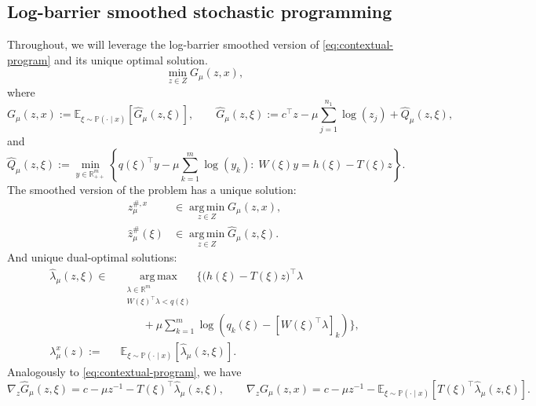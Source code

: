 \documentclass{article}
\newcommand{\R}{\mathbb{R}}
\newcommand{\E}{\mathbb{E}}
\newcommand{\argmin}{\operatorname*{arg\,min}}
\newcommand{\argmax}{\operatorname*{arg\,max}}
\theoremstyle{plain}
\begin{document}
\subsection{Log-barrier smoothed stochastic programming}
\label{sec:contextual-logbarrier}
Throughout, we will leverage the log-barrier smoothed version of \eqref{eq:contextual-program} and its unique
optimal solution.
\begin{equation}
\label{eq:contextual-program-mu}
\min_{z\in Z} G_\mu(z,x),
\end{equation}
where
\begin{equation}
\label{eq:contextual-G-mu}
G_\mu(z,x):=\E_{\xi\sim\mathbb P(\cdot\mid x)}\!\left[\hat G_\mu(z,\xi)\right],
\qquad
\hat G_\mu(z,\xi):=c^\top z-\mu\sum_{j=1}^{n_1}\log(z_j)+\hat Q_\mu(z,\xi),
\end{equation}
and
\begin{equation}
\label{eq:contextual-hatQ-mu}
\hat Q_\mu(z,\xi):=
\min_{y\in\R^{m}_{++}}
\left\{
q(\xi)^\top y-\mu\sum_{k=1}^{m}\log(y_k):\;W(\xi)y=h(\xi)-T(\xi)z
\right\}.
\end{equation}
The smoothed version of the problem has a unique solution:
\begin{equation}
\label{eq:canonical-contextual-solution-mu}
\begin{aligned}
z_\mu^{\#,x} &\in \argmin_{z\in Z} G_\mu(z,x),\\
\hat z_\mu^{\#}(\xi) &\in \argmin_{z\in Z} \hat G_\mu(z,\xi).
\end{aligned}
\end{equation}
And unique dual-optimal solutions:
\begin{equation}
\label{eq:contextual-dual-mu}
\begin{aligned}
\hat\lambda_\mu(z,\xi)\in\;&
\argmax_{\substack{\lambda\in\R^{m}\\ W(\xi)^\top\lambda<q(\xi)}}
\Bigg\{
\big(h(\xi)-T(\xi)z\big)^\top\lambda \\
&\qquad
+ \mu\sum_{k=1}^{m}\log\!\left(q_k(\xi)-[W(\xi)^\top\lambda]_k\right)
\Bigg\},\\
\lambda_\mu^x(z):=\;&\E_{\xi\sim\mathbb P(\cdot\mid x)}\!\left[\hat\lambda_\mu(z,\xi)\right].
\end{aligned}
\end{equation}
Analogously to \eqref{eq:contextual-program}, we have
\begin{equation}
\label{eq:danskin-contextual-mu}
\nabla_z \hat G_\mu(z,\xi)=c-\mu z^{-1}-T(\xi)^\top\hat\lambda_\mu(z,\xi),
\qquad
\nabla_z G_\mu(z,x)=c-\mu z^{-1}-\E_{\xi\sim\mathbb P(\cdot\mid x)}\!\left[T(\xi)^\top\hat\lambda_\mu(z,\xi)\right].
\end{equation}
\end{document}
